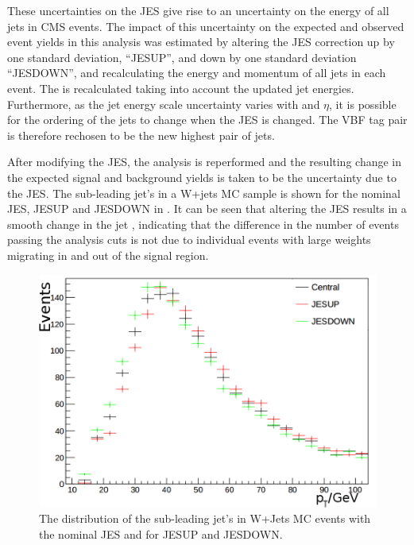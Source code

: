 These uncertainties on the \ac{JES} give rise to an uncertainty on the energy of all jets in CMS events. The impact of this uncertainty on the expected and observed event yields in this analysis was estimated by altering the \ac{JES} correction up by one standard deviation, ``JESUP'', and down by one standard deviation ``JESDOWN'', and recalculating the energy and momentum of all jets in each event. The \MET is recalculated taking into account the updated jet energies. Furthermore, as the jet energy scale uncertainty varies with \pt and $\eta$, it is possible for the \pt ordering of the jets to change when the \ac{JES} is changed. The \ac{VBF} tag pair is therefore rechosen to be the new highest \pt pair of jets. 

After modifying the \ac{JES}, the analysis is reperformed and the resulting change in the expected signal and background yields is taken to be the uncertainty due to the \ac{JES}. The sub-leading jet's \pt in a W+jets \ac{MC} sample is shown for the nominal \ac{JES}, JESUP and JESDOWN in . It can be seen that altering the \ac{JES} results in a smooth change in the jet \pt, indicating that the difference in the number of events passing the analysis cuts is not due to individual events with large weights migrating in and out of the signal region.

\begin{figure}
  \includegraphics[width=\largefigwidth]{plots/prompt/jescheckzoom.png}
  \caption{The distribution of the sub-leading jet's \pt in W+Jets \ac{MC} events with the nominal \ac{JES} and for JESUP and JESDOWN.}
  \label{fig:promptjes}
\end{figure}

